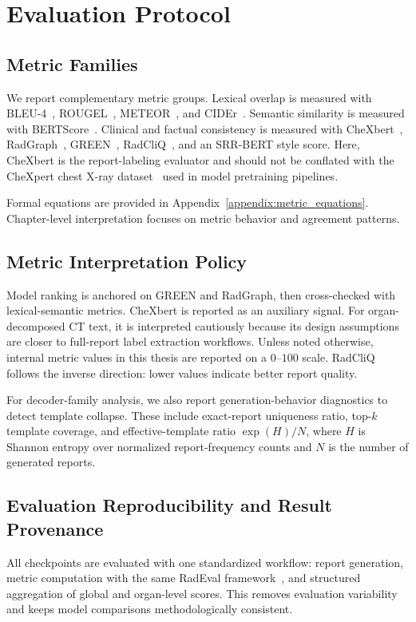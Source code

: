 \section{Evaluation Protocol}\label{sec:exp_eval_protocol}
\subsection{Metric Families}\label{sec:evaluation_metrics}
We report complementary metric groups. Lexical overlap is measured with BLEU-4~\cite{papineni2002bleu}, \ac{ROUGEL}~\cite{lin2004rouge}, METEOR~\cite{banerjee2005meteor}, and \ac{CIDEr}~\cite{vedantam2015cider}. Semantic similarity is measured with \ac{BERTScore}~\cite{zhang2019bertscore}. Clinical and factual consistency is measured with \ac{CheXbert}~\cite{smit2020chexbert}, \ac{RadGraph}~\cite{jain2021radgraph}, \ac{GREEN}~\cite{ostmeier2024green}, \ac{RadCliQ}~\cite{yu2023radcliq}, and an SRR-BERT style score.
Here, \ac{CheXbert} is the report-labeling evaluator and should not be conflated with the CheXpert chest X-ray dataset~\cite{irvin2019chexpert} used in model pretraining pipelines.

Formal equations are provided in Appendix~\ref{appendix:metric_equations}. Chapter-level interpretation focuses on metric behavior and agreement patterns.

\subsection{Metric Interpretation Policy}\label{sec:metric_interpretation_policy}
Model ranking is anchored on \ac{GREEN} and \ac{RadGraph}, then cross-checked with lexical-semantic metrics. \ac{CheXbert} is reported as an auxiliary signal. For organ-decomposed CT text, it is interpreted cautiously because its design assumptions are closer to full-report label extraction workflows.
Unless noted otherwise, internal metric values in this thesis are reported on a $0$--$100$ scale.
\ac{RadCliQ} follows the inverse direction: lower values indicate better report quality.

For decoder-family analysis, we also report generation-behavior diagnostics to detect template collapse. These include exact-report uniqueness ratio, top-$k$ template coverage, and effective-template ratio $\exp(H)/N$, where $H$ is Shannon entropy over normalized report-frequency counts and $N$ is the number of generated reports.

\subsection{Evaluation Reproducibility and Result Provenance}
All checkpoints are evaluated with one standardized workflow: report generation, metric computation with the same RadEval framework~\cite{xu-etal-2025-radeval}, and structured aggregation of global and organ-level scores. This removes evaluation variability and keeps model comparisons methodologically consistent.

